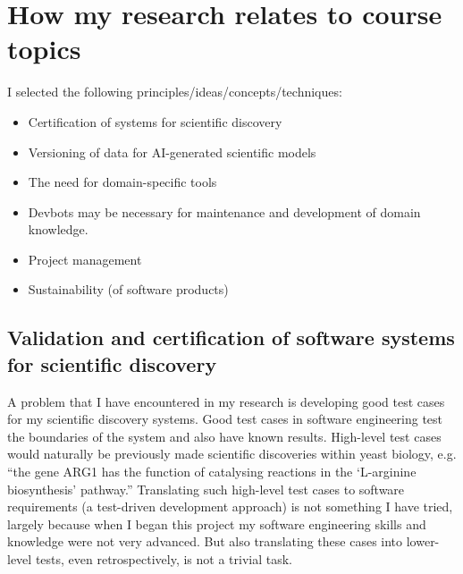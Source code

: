 \documentclass[11pt]{article}
\begin{document}
\section{How my research relates to course topics}

I selected the following principles/ideas/concepts/techniques:

\begin{itemize}
	\item Certification of systems for scientific discovery
	\item Versioning of data for AI-generated scientific models
	\item The need for domain-specific tools
	\item Devbots may be necessary for maintenance and development of domain knowledge.
	\item Project management
	\item Sustainability (of software products)
\end{itemize}

\subsection{Validation and certification of software systems for scientific discovery}

A problem that I have encountered in my research is developing good test cases for my scientific discovery systems.
Good test cases in software engineering test the boundaries of the system and also have known results.
High-level test cases would naturally be previously made scientific discoveries within yeast biology, e.g. ``the gene ARG1 has the function of catalysing reactions in the `L-arginine biosynthesis' pathway.''
Translating such high-level test cases to software requirements (a test-driven development approach) is not something I have tried, largely because when I began this project my software engineering skills and knowledge were not very advanced.
But also translating these cases into lower-level tests, even retrospectively, is not a trivial task.
\end{document}
